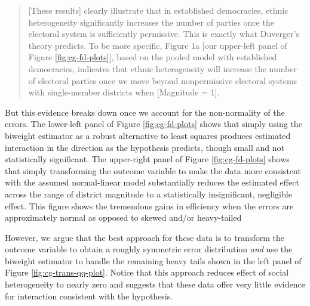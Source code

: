 \documentclass[12pt]{article}
\begin{document}
\begin{quote}
[These results] clearly illustrate that in established democracies, ethnic heterogeneity significantly increases the number of parties once the electoral system is sufficiently permissive. This is exactly what Duverger's theory predicts. To be more specific, Figure 1a [our upper-left panel of Figure \ref{fig:cg-fd-plots}], based on the pooled model with established democracies, indicates that ethnic heterogeneity will increase the number of electoral parties once we move beyond nonpermissive electoral systems with single-member districts when [Magnitude = 1].
\end{quote}

But this evidence breaks down once we account for the non-normality of the errors. The lower-left panel of Figure \ref{fig:cg-fd-plots} shows that simply using the biweight estimator as a robust alternative to least squares produces estimated interaction in the  direction as the hypothesis predicts, though small and not statistically significant. The upper-right panel of Figure \ref{fig:cg-fd-plots} shows that simply transforming the outcome variable to make the data more consistent with the assumed normal-linear model substantially reduces the estimated effect across the range of district magnitude to a statistically insignificant, negligible effect. This figure shows the tremendous gains in efficiency when the errors are approximately normal as opposed to skewed and/or heavy-tailed

However, we argue that the best approach for these data is to transform the outcome variable to obtain a roughly symmetric error distribution \textit{and} use the biweight estimator to handle the remaining heavy tails shown in the left panel of Figure \ref{fig:cg-trans-qq-plot}. Notice that this approach reduces effect of social heterogeneity to nearly zero and suggests that these data offer very little evidence for interaction consistent with the hypothesis.
\end{document}
